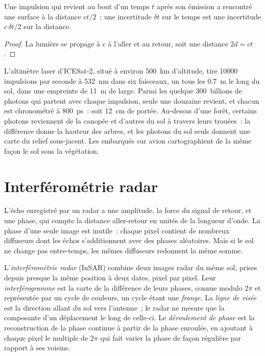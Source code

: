 \begin{proposition}\label{prop:b3:remote-sensing-gis:tof}
Une impulsion qui revient au bout d'un temps $t$ après son émission a rencontré une
surface à la distance $ct/2$~; une incertitude $\delta t$ sur le temps est une incertitude
$c\,\delta t/2$ sur la distance.
\end{proposition}

\begin{proof}
La lumière se propage à $c$ à l'aller et au retour, soit une distance $2d = ct$.
\end{proof}

L'altimètre laser d'ICESat-2, situé à environ \qty{500}{km} d'altitude, tire
\num{10000} impulsions par seconde à \qty{532}{nm} dans six faisceaux, un tous les
\qty{0.7}{m} le long du sol, dans une empreinte de \qty{11}{m} de large. Parmi les
quelque 300~billions de photons qui partent avec chaque impulsion, seule une douzaine
revient, et chacun est chronométré à \qty{800}{ps}~: soit \qty{12}{cm} de portée. Au-dessus d'une
forêt, certains photons reviennent de la canopée et d'autres du sol
à travers leurs trouées~: la différence donne la hauteur des arbres, et les
photons du sol seuls donnent une carte du relief sous-jacent. Les  embarqués sur
avion cartographient de la même façon le sol sous la végétation.

\section{Interférométrie radar}\label{sec:b3:remote-sensing-gis:insar}

L'écho enregistré par un radar a une amplitude, la force du signal de retour,
et une phase, qui compte la distance aller-retour en unités de la
longueur d'onde. La phase d'une seule image est inutile~: chaque pixel contient
de nombreux diffuseurs dont les échos s'additionnent avec des phases aléatoires. Mais si le sol ne
change pas entre-temps, les mêmes diffuseurs redonnent la même somme.

\begin{definition}\label{def:b3:remote-sensing-gis:insar}
L'\emph{interférométrie radar} (InSAR) combine
deux images radar du même sol, prises depuis presque la même position
à deux dates, pixel par pixel. Leur \emph{interférogramme}
est la carte de la différence de leurs phases, connue modulo $2\pi$ et
représentée par un cycle de couleurs, un cycle étant une \emph{frange}. La \emph{ligne de
visée} est la direction allant du sol vers
l'antenne~; le radar ne mesure que la composante d'un déplacement le long
de celle-ci. Le \emph{déroulement de phase} est la reconstruction
de la phase continue à partir de la phase enroulée, en ajoutant à chaque pixel le
multiple de $2\pi$ qui fait varier la phase de façon régulière par rapport à ses voisins.
\end{definition}

